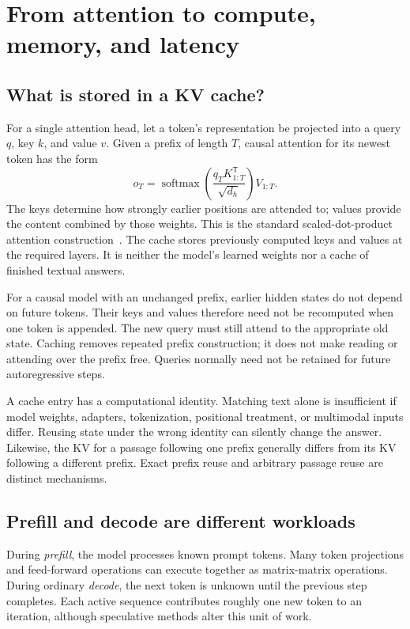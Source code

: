 \section{From attention to compute, memory, and latency}
\label{sec:fundamentals}
\subsection{What is stored in a KV cache?}
For a single attention head, let a token's representation be projected into a
query $q$, key $k$, and value $v$. Given a prefix of length $T$, causal attention
for its newest token has the form
\begin{equation}
 o_T=\operatorname{softmax}\!\left(\frac{q_T K_{1:T}^{\mathsf T}}{\sqrt{d_h}}\right)V_{1:T}.
 \label{eq:attention}
\end{equation}
The keys determine how strongly earlier positions are attended to; values
provide the content combined by those weights. This is the standard
scaled-dot-product attention construction~\cite{transformer}. The cache stores
previously computed keys and values at the required layers. It is neither the
model's learned weights nor a cache of finished textual answers.

For a causal model with an unchanged prefix, earlier hidden states do not depend
on future tokens. Their keys and values therefore need not be recomputed when
one token is appended. The new query must still attend to the appropriate old
state. Caching removes repeated prefix construction; it does not make reading
or attending over the prefix free. Queries normally need not be retained for
future autoregressive steps.

A cache entry has a computational identity. Matching text alone is insufficient
if model weights, adapters, tokenization, positional treatment, or multimodal
inputs differ. Reusing state under the wrong identity can silently change the
answer. Likewise, the KV for a passage following one prefix generally differs
from its KV following a different prefix. Exact prefix reuse and arbitrary
passage reuse are distinct mechanisms.

\subsection{Prefill and decode are different workloads}
During \emph{prefill}, the model processes known prompt tokens. Many token
projections and feed-forward operations can execute together as matrix-matrix
operations. During ordinary \emph{decode}, the next token is unknown until the
previous step completes. Each active sequence contributes roughly one new token
to an iteration, although speculative methods alter this unit of work.

